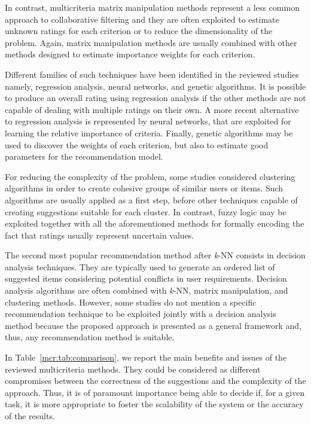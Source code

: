 In contrast, multicriteria matrix manipulation methods represent a less common approach to collaborative filtering and they are often exploited to estimate unknown ratings for each criterion or to reduce the dimensionality of the problem. Again, matrix manipulation methods are usually combined with other methods designed to estimate importance weights for each criterion.

Different families of such techniques have been identified in the reviewed studies namely, regression analysis, neural networks, and genetic algorithms. It is possible to produce an overall rating using regression analysis if the other methods are not capable of dealing with multiple ratings on their own. A more recent alternative to regression analysis is represented by neural networks, that are exploited for learning the relative importance of criteria. Finally, genetic algorithms may be used to discover the weights of each criterion, but also to estimate good parameters for the recommendation model.

For reducing the complexity of the problem, some studies considered clustering algorithms in order to create cohesive groups of similar users or items. Such algorithms are usually applied as a first step, before other techniques capable of creating suggestions suitable for each cluster. In contrast, fuzzy logic may be exploited together with all the aforementioned methods for formally encoding the fact that ratings usually represent uncertain values.

The second most popular recommendation method after \textit{k}-NN consists in decision analysis techniques. They are typically used to generate an ordered list of suggested items considering potential conflicts in user requirements. Decision analysis algorithms are often combined with \textit{k}-NN, matrix manipulation, and clustering methods. However, some studies do not mention a specific recommendation technique to be exploited jointly with a decision analysis method because the proposed approach is presented as a general framework and, thus, any recommendation method is suitable.

In Table~\ref{mcr:tab:comparison}, we report the main benefits and issues of the reviewed multicriteria methods. They could be considered as different compromises between the correctness of the suggestions and the complexity of the approach. Thus, it is of paramount importance being able to decide if, for a given task, it is more appropriate to foster the scalability of the system or the accuracy of the results.


